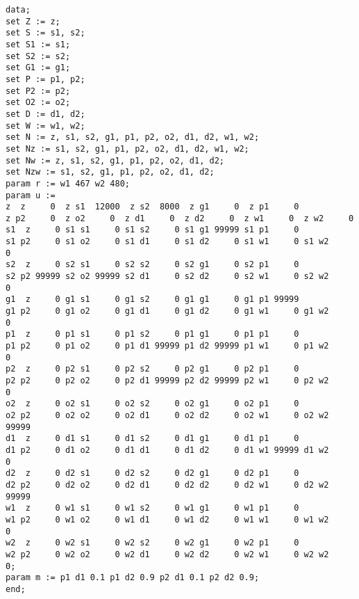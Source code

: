 \documentclass[12pt]{article}
\begin{document}
\begin{lstlisting}[caption= plik dat]
data;
set Z := z;
set S := s1, s2;
set S1 := s1;
set S2 := s2;
set G1 := g1;
set P := p1, p2;
set P2 := p2;
set O2 := o2;
set D := d1, d2;
set W := w1, w2;
set N := z, s1, s2, g1, p1, p2, o2, d1, d2, w1, w2;
set Nz := s1, s2, g1, p1, p2, o2, d1, d2, w1, w2;
set Nw := z, s1, s2, g1, p1, p2, o2, d1, d2;
set Nzw := s1, s2, g1, p1, p2, o2, d1, d2;
param r := w1 467 w2 480;
param u := 
z  z     0  z s1  12000  z s2  8000  z g1     0  z p1     0 
z p2     0  z o2     0  z d1     0  z d2     0  z w1     0  z w2     0 
s1  z     0 s1 s1     0 s1 s2     0 s1 g1 99999 s1 p1     0 
s1 p2     0 s1 o2     0 s1 d1     0 s1 d2     0 s1 w1     0 s1 w2     0 
s2  z     0 s2 s1     0 s2 s2     0 s2 g1     0 s2 p1     0 
s2 p2 99999 s2 o2 99999 s2 d1     0 s2 d2     0 s2 w1     0 s2 w2     0 
g1  z     0 g1 s1     0 g1 s2     0 g1 g1     0 g1 p1 99999 
g1 p2     0 g1 o2     0 g1 d1     0 g1 d2     0 g1 w1     0 g1 w2     0 
p1  z     0 p1 s1     0 p1 s2     0 p1 g1     0 p1 p1     0 
p1 p2     0 p1 o2     0 p1 d1 99999 p1 d2 99999 p1 w1     0 p1 w2     0 
p2  z     0 p2 s1     0 p2 s2     0 p2 g1     0 p2 p1     0 
p2 p2     0 p2 o2     0 p2 d1 99999 p2 d2 99999 p2 w1     0 p2 w2     0 
o2  z     0 o2 s1     0 o2 s2     0 o2 g1     0 o2 p1     0 
o2 p2     0 o2 o2     0 o2 d1     0 o2 d2     0 o2 w1     0 o2 w2 99999 
d1  z     0 d1 s1     0 d1 s2     0 d1 g1     0 d1 p1     0 
d1 p2     0 d1 o2     0 d1 d1     0 d1 d2     0 d1 w1 99999 d1 w2     0 
d2  z     0 d2 s1     0 d2 s2     0 d2 g1     0 d2 p1     0 
d2 p2     0 d2 o2     0 d2 d1     0 d2 d2     0 d2 w1     0 d2 w2 99999 
w1  z     0 w1 s1     0 w1 s2     0 w1 g1     0 w1 p1     0 
w1 p2     0 w1 o2     0 w1 d1     0 w1 d2     0 w1 w1     0 w1 w2     0 
w2  z     0 w2 s1     0 w2 s2     0 w2 g1     0 w2 p1     0 
w2 p2     0 w2 o2     0 w2 d1     0 w2 d2     0 w2 w1     0 w2 w2     0;
param m := p1 d1 0.1 p1 d2 0.9 p2 d1 0.1 p2 d2 0.9;
end;
\end{lstlisting}
\end{document}
